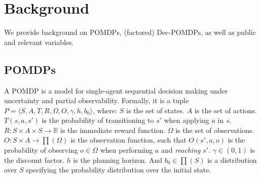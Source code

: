 \documentclass[letterpaper]{article}
\theoremstyle{definition}
\newcommand{\cbp}[0]{Collaborative Box-Pushing}
\begin{document}
 







\section{Background}

We provide background on POMDPs, (factored) Dec-POMDPs, as well as public and relevant variables.%


\subsection{POMDPs}
A POMDP is a model for single-agent sequential decision making under uncertainty and partial observability.
Formally, it is a tuple $P=\langle S, A, T, R, \Omega, O, \gamma, h, b_0 \rangle$, where:
$S$ is the set of states. $A$ is the set of actions.
$T(s, a, s')$ is the probability of transitioning to $s'$ when applying $a$ in $s$. 
$R:S \times A \times S \rightarrow \mathbb{R}$  is the immediate reward function. $\Omega$ is the set of observations. $O:S \times A \rightarrow \prod (\Omega)$ is the observation function, such that
$O(s', a, o)$ is the probability of observing $o\in \Omega$ when performing $a$ and \emph{reaching} $s'$. 
$\gamma \in (0,1)$ is the discount factor.  
$h$ is the planning horizon. And $b_0\in \prod(S)$ is a distribution over $S$ specifying the probability distribution over the initial state.
\end{document}
